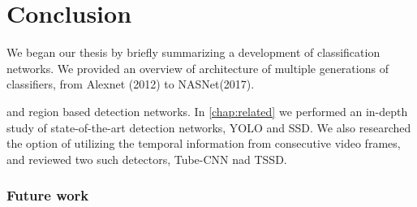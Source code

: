 \chapter*{Conclusion}
 We began our thesis by briefly summarizing a development of classification networks. We provided an overview of architecture of multiple generations of classifiers, from Alexnet (2012) to NASNet(2017).
 
 and region based detection networks. In \cref{chap:related} we performed an in-depth study of state-of-the-art detection networks, YOLO and SSD. We also researched the option of utilizing the temporal information from consecutive video frames, and reviewed two such detectors, Tube-CNN nad TSSD. 



\subsection*{Future work}

